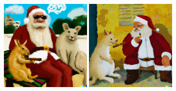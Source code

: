 \documentclass{article}
\newcommand{\imagewidthfactor}{0.4}
\begin{document}
\begin{figure}[h!]
\vspace{1.1em}
\includegraphics[width=\imagewidthfactor\textwidth]{media/6c.png}
\quad
\includegraphics[width=\imagewidthfactor\textwidth]{media/6d.png}
\end{figure}
\end{document}
